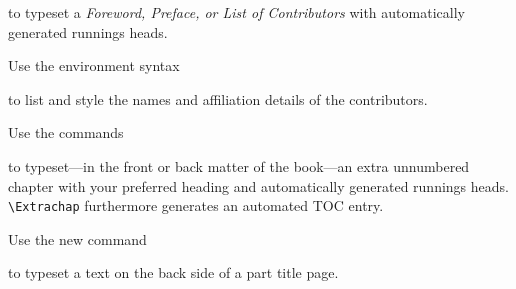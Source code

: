 \documentclass[graybox]{svmult}
\begin{document}
\begin{refguide}
\begin{sloppy}
\cprotect{}

to typeset a \textit{Foreword, Preface, or List of Contributors} with automatically generated runnings heads.

Use the environment syntax

\cprotect{}

to list and style the names and affiliation details of the contributors.

Use the commands

\cprotect{}

to typeset---in the front or back matter of the book---an extra unnumbered chapter with your preferred heading and automatically generated runnings heads.
\verb|\Extrachap| furthermore generates an automated TOC entry.

Use the new command

\cprotect{}

to typeset a text on the back side of a part title page.


\end{sloppy}
\end{refguide}
\end{document}
